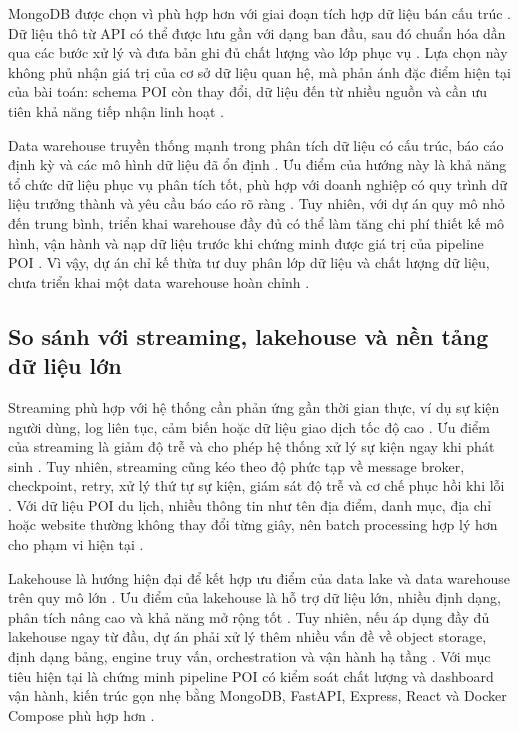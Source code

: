 \documentclass[12pt,a4paper]{article}
\begin{document}
MongoDB được chọn vì phù hợp hơn với giai đoạn tích hợp dữ liệu bán cấu trúc \cite{mongodbDataModel}. Dữ liệu thô từ API có thể được lưu gần với dạng ban đầu, sau đó chuẩn hóa dần qua các bước xử lý và đưa bản ghi đủ chất lượng vào lớp phục vụ \cite{mongodbDataModel}. Lựa chọn này không phủ nhận giá trị của cơ sở dữ liệu quan hệ, mà phản ánh đặc điểm hiện tại của bài toán: schema POI còn thay đổi, dữ liệu đến từ nhiều nguồn và cần ưu tiên khả năng tiếp nhận linh hoạt \cite{yeboah2021}.\par

Data warehouse truyền thống mạnh trong phân tích dữ liệu có cấu trúc, báo cáo định kỳ và các mô hình dữ liệu đã ổn định \cite{ibmWarehouseLake}. Ưu điểm của hướng này là khả năng tổ chức dữ liệu phục vụ phân tích tốt, phù hợp với doanh nghiệp có quy trình dữ liệu trưởng thành và yêu cầu báo cáo rõ ràng \cite{ibmWarehouseLake}. Tuy nhiên, với dự án quy mô nhỏ đến trung bình, triển khai warehouse đầy đủ có thể làm tăng chi phí thiết kế mô hình, vận hành và nạp dữ liệu trước khi chứng minh được giá trị của pipeline POI \cite{ibmWarehouseLake}. Vì vậy, dự án chỉ kế thừa tư duy phân lớp dữ liệu và chất lượng dữ liệu, chưa triển khai một data warehouse hoàn chỉnh \cite{databricksMedallion}.\par

\subsection{So sánh với streaming, lakehouse và nền tảng dữ liệu lớn}

Streaming phù hợp với hệ thống cần phản ứng gần thời gian thực, ví dụ sự kiện người dùng, log liên tục, cảm biến hoặc dữ liệu giao dịch tốc độ cao \cite{awsStreaming}. Ưu điểm của streaming là giảm độ trễ và cho phép hệ thống xử lý sự kiện ngay khi phát sinh \cite{awsStreaming}. Tuy nhiên, streaming cũng kéo theo độ phức tạp về message broker, checkpoint, retry, xử lý thứ tự sự kiện, giám sát độ trễ và cơ chế phục hồi khi lỗi \cite{awsStreaming}. Với dữ liệu POI du lịch, nhiều thông tin như tên địa điểm, danh mục, địa chỉ hoặc website thường không thay đổi từng giây, nên batch processing hợp lý hơn cho phạm vi hiện tại \cite{ibmETL}.\par

Lakehouse là hướng hiện đại để kết hợp ưu điểm của data lake và data warehouse trên quy mô lớn \cite{armbrust2021}. Ưu điểm của lakehouse là hỗ trợ dữ liệu lớn, nhiều định dạng, phân tích nâng cao và khả năng mở rộng tốt \cite{armbrust2021}. Tuy nhiên, nếu áp dụng đầy đủ lakehouse ngay từ đầu, dự án phải xử lý thêm nhiều vấn đề về object storage, định dạng bảng, engine truy vấn, orchestration và vận hành hạ tầng \cite{armbrust2021}. Với mục tiêu hiện tại là chứng minh pipeline POI có kiểm soát chất lượng và dashboard vận hành, kiến trúc gọn nhẹ bằng MongoDB, FastAPI, Express, React và Docker Compose phù hợp hơn \cite{dockerCompose}.\par
\end{document}
